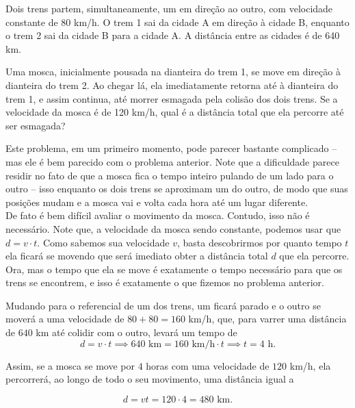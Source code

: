 \begin{exemplo}[Nível II]\label{exemplo_distanciamovuniforme02}


Dois trens partem, simultaneamente, um em direção ao outro, com velocidade constante de 80 km/h. O trem 1 sai da cidade A em direção à cidade B, enquanto o trem 2 sai da cidade B para a cidade A. A distância entre as cidades é de 640 km.

Uma mosca, inicialmente pousada na dianteira do trem 1, se move em direção à dianteira do trem 2. Ao chegar lá, ela imediatamente retorna até à dianteira do trem 1, e assim continua, até morrer esmagada pela colisão dos dois trens. Se a velocidade da mosca é de 120 km/h, qual é a distância total que ela percorre até ser esmagada?

\resolucao





Este problema, em um primeiro momento, pode parecer bastante complicado -- mas ele é bem parecido com o problema anterior. Note que a dificuldade parece residir no fato de que a mosca fica o tempo inteiro pulando de um lado para o outro -- isso enquanto os dois trens se aproximam um do outro, de modo que suas posições mudam e a mosca vai e volta cada hora até um lugar diferente.
\\

De fato é bem difícil avaliar o movimento da mosca. Contudo, isso não é necessário. Note que, a velocidade da mosca sendo constante, podemos usar que $d=v \cdot t.$ Como sabemos sua velocidade $v$, basta descobrirmos por quanto tempo $t$ ela ficará se movendo que será imediato obter a distância total $d$ que ela percorre. Ora, mas o tempo que ela se move é exatamente o tempo necessário para que os trens se encontrem, e isso é exatamente o que fizemos no problema anterior.

Mudando para o referencial de um dos trens, um ficará parado e o outro se moverá a uma velocidade de $80+80 = 160$ km/h, que, para varrer uma distância de $640$ km até colidir com o outro, levará um tempo de
$$ d= v \cdot t \implies 640 \text{ km} = 160 \text{ km/h} \cdot t \implies \boxed{t=4 \text{ h.}}$$

Assim, se a mosca se move por $4$ horas com uma velocidade de $120$ km/h, ela percorrerá, ao longo de todo o seu movimento, uma distância igual a

$$ d = vt = 120 \cdot 4 = \boxed{480 \text{ km.}}$$

\end{exemplo}


